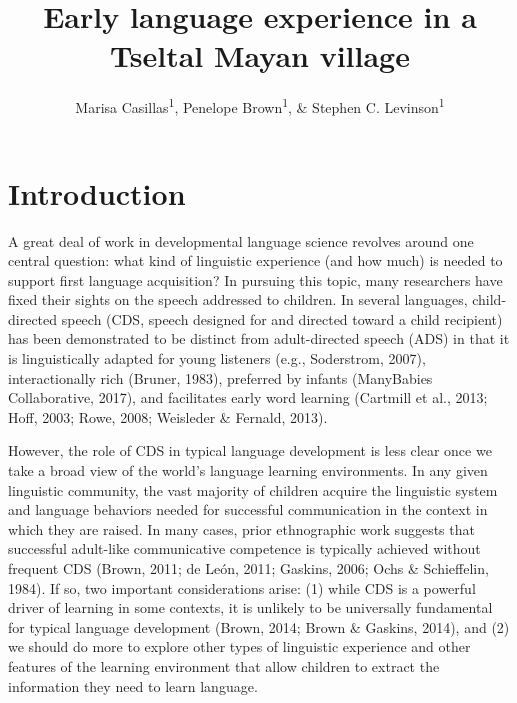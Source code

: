 \documentclass[floatsintext,man]{apa6}
\title{Early language experience in a Tseltal Mayan village}
\author{Marisa Casillas\textsuperscript{1}, Penelope Brown\textsuperscript{1}, \& Stephen C. Levinson\textsuperscript{1}}
\affiliation{
    \vspace{0.5cm}
          \textsuperscript{1} Max Planck Institute for Psycholinguistics  }
\theoremstyle{definition}
\theoremstyle{definition}
\theoremstyle{definition}
\theoremstyle{remark}
\begin{document}
\maketitle

\setcounter{secnumdepth}{0}



\section{Introduction}\label{intro}

A great deal of work in developmental language science revolves around
one central question: what kind of linguistic experience (and how much)
is needed to support first language acquisition? In pursuing this topic,
many researchers have fixed their sights on the speech addressed to
children. In several languages, child-directed speech (CDS, speech
designed for and directed toward a child recipient) has been
demonstrated to be distinct from adult-directed speech (ADS) in that it
is linguistically adapted for young listeners (e.g., Soderstrom, 2007),
interactionally rich (Bruner, 1983), preferred by infants (ManyBabies
Collaborative, 2017), and facilitates early word learning (Cartmill et
al., 2013; Hoff, 2003; Rowe, 2008; Weisleder \& Fernald, 2013).

However, the role of CDS in typical language development is less clear
once we take a broad view of the world's language learning environments.
In any given linguistic community, the vast majority of children acquire
the linguistic system and language behaviors needed for successful
communication in the context in which they are raised. In many cases,
prior ethnographic work suggests that successful adult-like
communicative competence is typically achieved without frequent CDS
(Brown, 2011; de León, 2011; Gaskins, 2006; Ochs \& Schieffelin, 1984).
If so, two important considerations arise: (1) while CDS is a powerful
driver of learning in some contexts, it is unlikely to be universally
fundamental for typical language development (Brown, 2014; Brown \&
Gaskins, 2014), and (2) we should do more to explore other types of
linguistic experience and other features of the learning environment
that allow children to extract the information they need to learn
language.
\end{document}
